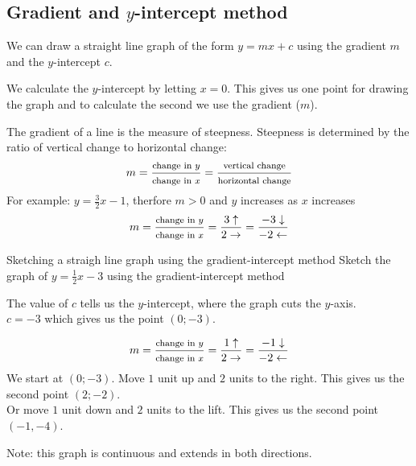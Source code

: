 \subsection*{Gradient and $y$-intercept method}
We can draw a straight line graph of the form $y=mx+c$ using the gradient $m$ and the $y$-intercept $c$. \par We calculate the $y$-intercept by letting $x=0$. This gives us one point for drawing the graph and to calculate the second we use the gradient ($m$).\par

The gradient of a line is the measure of steepness. Steepness is determined by the ratio of vertical change to horizontal change:
\begin{equation*}
m = \dfrac{\mbox{\footnotesize change in $y$}}{\mbox{\footnotesize change in $x$}} = \dfrac{\mbox{\footnotesize vertical change}}{\mbox{\footnotesize horizontal change}}
\end{equation*}
For example: $y=\frac{3}{2}x-1$, therfore $m > 0$ and $y$ increases as $x$ increases
\begin{equation*}
 m = \dfrac{\mbox{\footnotesize change in $y$}}{\mbox{\footnotesize change in $x$}} = \dfrac{3\uparrow}{2\rightarrow} = \dfrac{-3\downarrow}{-2\leftarrow}
\end{equation*}



\begin{wex}{Sketching a straigh line graph using the gradient-intercept method}
{Sketch the graph of $y=\frac{1}{2}x-3$ using the gradient-intercept method}
{
The value of $c$ tells us the $y$-intercept, where the graph cuts the $y$-axis. \\
$c=-3$ which gives us the point $(0;-3)$.


\begin{equation*}
 m = \dfrac{\mbox{\footnotesize change in $y$}}{\mbox{\footnotesize change in $x$}} = \dfrac{1\uparrow}{2\rightarrow} = \dfrac{-1\downarrow}{-2\leftarrow}
\end{equation*}
We start at  $(0;-3)$. Move $1$ unit up and $2$ units to the right. This gives us the second point $(2;-2)$. \\
Or move $1$ unit down and $2$ units to the lift. This gives us the second point $(-1,-4)$.



Note: this graph is continuous and extends in both directions.       
}
\end{wex}

